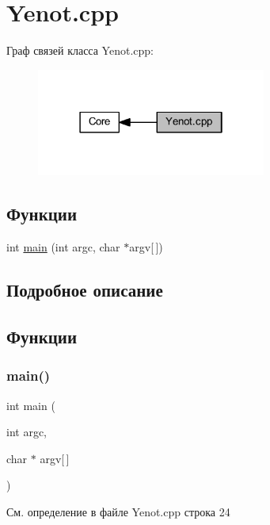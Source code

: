 \hypertarget{group__yenotcpp}{}\section{Yenot.\+cpp}
\label{group__yenotcpp}
Граф связей класса Yenot.\+cpp\+:\nopagebreak
\begin{figure}[H]
\begin{center}
\leavevmode
\includegraphics[width=214pt]{group__yenotcpp}
\end{center}
\end{figure}
\subsection*{Функции}
\begin{DoxyCompactItemize}
\item 
int \mbox{\hyperlink{group__yenotcpp_ga0ddf1224851353fc92bfbff6f499fa97}{main}} (int argc, char $\ast$argv\mbox{[}$\,$\mbox{]})
\end{DoxyCompactItemize}


\subsection{Подробное описание}


\subsection{Функции}
\mbox{\label{group__yenotcpp_ga0ddf1224851353fc92bfbff6f499fa97}} 
\subsubsection{\texorpdfstring{main()}{main()}}
{\footnotesize\ttfamily int main (\begin{DoxyParamCaption}\item[{int}]{argc,  }\item[{char $\ast$}]{argv\mbox{[}$\,$\mbox{]} }\end{DoxyParamCaption})}



См. определение в файле Yenot.\+cpp строка 24

